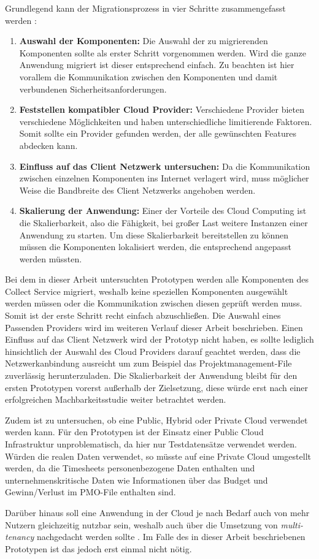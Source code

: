 Grundlegend kann der Migrationsprozess  in vier Schritte zusammengefasst werden \cite[Vgl. auch im Folgenden][S. 34f]{Maenhaut2016}:
\begin{enumerate}
\item \textbf{Auswahl der Komponenten:} Die Auswahl der zu migrierenden Komponenten sollte als erster Schritt vorgenommen werden. Wird die ganze Anwendung migriert ist dieser entsprechend einfach. Zu beachten ist hier vorallem die Kommunikation zwischen den Komponenten und damit verbundenen Sicherheitsanforderungen.
\item \textbf{Feststellen kompatibler Cloud Provider:} Verschiedene Provider bieten verschiedene Möglichkeiten und haben unterschiedliche limitierende Faktoren. Somit sollte ein Provider gefunden werden, der alle gewünschten Features abdecken kann.
\item \textbf{Einfluss auf das Client Netzwerk untersuchen:} Da die Kommunikation zwischen einzelnen Komponenten ins Internet verlagert wird, muss möglicher Weise die Bandbreite des Client Netzwerks angehoben werden.
\item \textbf{Skalierung der Anwendung:} Einer der Vorteile des Cloud Computing ist die Skalierbarkeit, also die Fähigkeit, bei großer Last weitere Instanzen einer Anwendung zu starten. Um diese Skalierbarkeit bereitstellen zu können müssen die Komponenten lokalisiert werden, die entsprechend angepasst werden müssten.
\end{enumerate}


Bei dem in dieser Arbeit untersuchten Prototypen werden alle Komponenten des Collect Service migriert, weshalb keine speziellen Komponenten ausgewählt werden müssen oder die Kommunikation zwischen diesen geprüft werden muss. Somit ist der erste Schritt recht einfach abzuschließen. Die Auswahl eines Passenden Providers wird im weiteren Verlauf dieser Arbeit beschrieben. Einen Einfluss auf das Client Netzwerk wird der Prototyp nicht haben, es sollte lediglich hinsichtlich der Auswahl des Cloud Providers darauf geachtet werden, dass die Netzwerkanbindung ausreicht um zum Beispiel das Projektmanagement-File zuverlässig herunterzuladen. Die Skalierbarkeit der Anwendung bleibt für den ersten Prototypen vorerst außerhalb der Zielsetzung, diese würde erst nach einer erfolgreichen Machbarkeitsstudie weiter betrachtet werden.

Zudem ist zu untersuchen, ob eine Public, Hybrid oder Private Cloud verwendet werden kann. Für den Prototypen ist der Einsatz einer Public Cloud Infrastruktur unproblematisch, da hier nur Testdatensätze verwendet werden. Würden die realen Daten verwendet, so müsste auf eine Private Cloud umgestellt werden, da die Timesheets personenbezogene Daten enthalten und unternehmenskritische Daten wie Informationen über das Budget und Gewinn/Verlust im PMO-File enthalten sind.

Darüber hinaus soll eine Anwendung in der Cloud je nach Bedarf auch von mehr Nutzern gleichzeitig nutzbar sein, weshalb auch über die Umsetzung von \textit{multi-tenancy} nachgedacht werden sollte \cite[Vgl.][S. 34ff]{Maenhaut2016}. Im Falle des in dieser Arbeit beschriebenen Prototypen ist das jedoch erst einmal nicht nötig.
\pagebreak